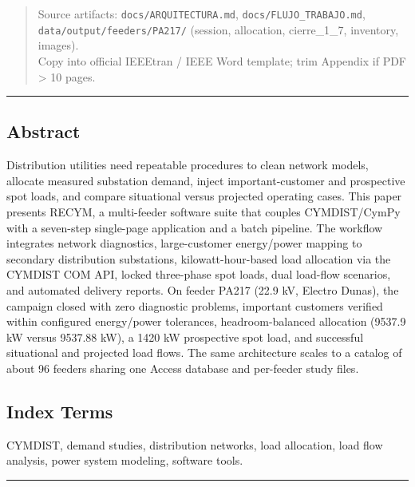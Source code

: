 \documentclass[
  11pt,
]{article}
\begin{document}
\begin{quote}
Source artifacts: \texttt{docs/ARQUITECTURA.md},
\texttt{docs/FLUJO\_TRABAJO.md},\\
\texttt{data/output/feeders/PA217/} (session, allocation, cierre\_1\_7,
inventory, images).\\
Copy into official IEEEtran / IEEE Word template; trim Appendix if PDF
\textgreater{} 10 pages.
\end{quote}

\begin{center}\rule{0.5\linewidth}{0.5pt}\end{center}

\subsection{Abstract}\label{abstract}

Distribution utilities need repeatable procedures to clean network
models, allocate measured substation demand, inject important-customer
and prospective spot loads, and compare situational versus projected
operating cases. This paper presents RECYM, a multi-feeder software
suite that couples CYMDIST/CymPy with a seven-step single-page
application and a batch pipeline. The workflow integrates network
diagnostics, large-customer energy/power mapping to secondary
distribution substations, kilowatt-hour-based load allocation via the
CYMDIST COM API, locked three-phase spot loads, dual load-flow
scenarios, and automated delivery reports. On feeder PA217 (22.9 kV,
Electro Dunas), the campaign closed with zero diagnostic problems,
important customers verified within configured energy/power tolerances,
headroom-balanced allocation (9537.9 kW versus 9537.88 kW), a 1420 kW
prospective spot load, and successful situational and projected load
flows. The same architecture scales to a catalog of about 96 feeders
sharing one Access database and per-feeder study files.

\subsection{Index Terms}\label{index-terms}

CYMDIST, demand studies, distribution networks, load allocation, load
flow analysis, power system modeling, software tools.

\begin{center}\rule{0.5\linewidth}{0.5pt}\end{center}
\end{document}
